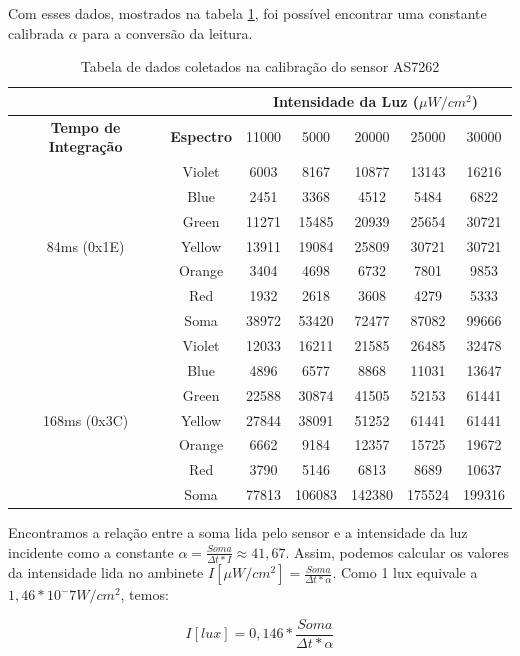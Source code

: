 \documentclass[../monografia.tex]{subfiles}
\begin{document}
Com esses dados, mostrados na tabela \ref{table:tabela-luz}, foi possível encontrar uma constante calibrada $\alpha$  para a conversão da leitura. \newpage

\begin{table}[h]
\centering
\begin{tabular}{ |c|c|c|c|c|c|c| }
	\hline
	\multicolumn{2}{|c|}{} & \multicolumn{5}{|c|}{\textbf{Intensidade da Luz} ($\mu W/cm^2$)} \\
	\hline
	\textbf{Tempo de Integração} & \textbf{Espectro} & 11000	& 5000 & 20000 & 25000 & 30000 \\
	\hline
	\hline
	\multirow{7}{3em}{84ms (0x1E)} & Violet & 6003&8167&10877&13143 & 16216 \\
	& Blue	&2451	&3368	&4512	&5484	&6822 \\
	& Green	&11271	&15485	&20939	&25654	&30721 \\
	& Yellow &13911	&19084	&25809	&30721	&30721 \\
	& Orange &3404	&4698	&6732	&7801	&9853 \\
	& Red	&1932	&2618	&3608	&4279	&5333 \\
	\hline
	& Soma	&38972	&53420	&72477	&87082	&99666 \\
	\hline
	\multirow{7}{3em}{168ms (0x3C)} & Violet & 12033&	16211&	21585&	26485&	32478\\
	&Blue	&4896	&6577	&8868	&11031	&13647 \\
	&Green	&22588	&30874	&41505	&52153	&61441 \\
	&Yellow	&27844	&38091	&51252	&61441	&61441 \\
	&Orange	&6662	&9184	&12357	&15725	&19672 \\
	&Red	&3790	&5146	&6813	&8689	&10637 \\
	\hline
	&Soma	&77813	&106083	&142380	&175524	&199316 \\
	\hline
\end{tabular}
\caption{Tabela de dados coletados na calibração do sensor AS7262}
\label{table:tabela-luz}
\end{table}

Encontramos a relação entre a soma lida pelo sensor e a intensidade da luz incidente como a constante $\alpha = \frac{Soma}{\Delta t * I} \approx 41,67$. Assim, podemos calcular os valores da intensidade lida no ambinete $I[\mu W/cm^2]=\frac{Soma}{\Delta t * \alpha}$. Como 1 lux equivale a $1,46*10^-7 W/cm^2$, temos: 

\[I[lux]= 0,146*\frac{Soma}{\Delta t * \alpha}\] %
\end{document}
